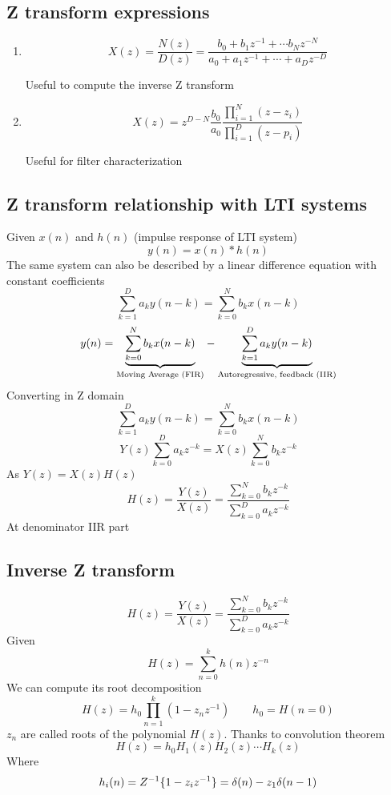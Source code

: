 \subsection{Z transform expressions}
\begin{enumerate}
    \item 
    \begin{LARGE}
        $$
        X(z)=\frac{N(z)}{D(z)}=\frac{
            b_0+b_1z^{-1}+\cdots b_Nz^{-N}
        }{
            a_0+a_1z^{-1}+\cdots+a_Dz^{-D}
        }
        $$
    \end{LARGE}
    Useful to compute the inverse Z transform
    \item
    \begin{LARGE}
        $$
            X(z)=z^{D-N}\frac{b_0}{a_0}\frac{
                \prod_{i=1}^N(z-z_i)
            }{\prod_{i=1}^D(z-p_i)}
        $$
    \end{LARGE}
    Useful for filter characterization
\end{enumerate}

\subsection{Z transform relationship with LTI systems}
Given $x(n)$ and $h(n)$ (impulse response of LTI system)
$$y(n)=x(n)*h(n)$$
The same system can also be described by a linear difference equation with constant coefficients
    $$
    \sum_{k=1}^Da_ky(n-k)=
    \sum_{k=0}^Nb_kx(n-k)
    $$
    $$
    y(n)=\underlabel{\sum_{k=0}^Nb_kx(n-k)}{Moving Average (FIR)}-
    \underlabel{\sum_{k=1}^Da_ky(n-k)}{Autoregressive, feedback (IIR)}
    $$
Converting in Z domain
    $$
    \sum_{k=1}^Da_ky(n-k)=
    \sum_{k=0}^Nb_kx(n-k)
    $$
    $$
    Y(z)\sum_{k=0}^Da_kz^{-k}=
    X(z)\sum_{k=0}^Nb_kz^{-k}
    $$
As $Y(z)=X(z)H(z)$
$$
H(z)=\frac{Y(z)}{X(z)}=\frac{\sum_{k=0}^Nb_kz^{-k}}{\sum_{k=0}^Da_kz^{-k}}
$$
At denominator IIR part

\subsection{Inverse Z transform}
$$
H(z)=\frac{Y(z)}{X(z)}=\frac{\sum_{k=0}^Nb_kz^{-k}}{\sum_{k=0}^Da_kz^{-k}}
$$
Given
$$
H(z)=\sum_{n=0}^kh(n)z^{-n}
$$
We can compute its root decomposition
$$
H(z)=h_0\prod_{n=1}^k(1-z_nz^{-1})\qquad h_0=H(n=0)
$$
$z_n$ are called roots of the polynomial $H(z)$. Thanks to convolution theorem
$$
H(z)=h_0H_1(z)H_2(z)\cdots H_k(z)
$$
Where
$$
h_i(n)=Z^{-1}\brackets{1-z_iz^{-1}}=\delta(n)-z_1\delta(n-1)
$$

